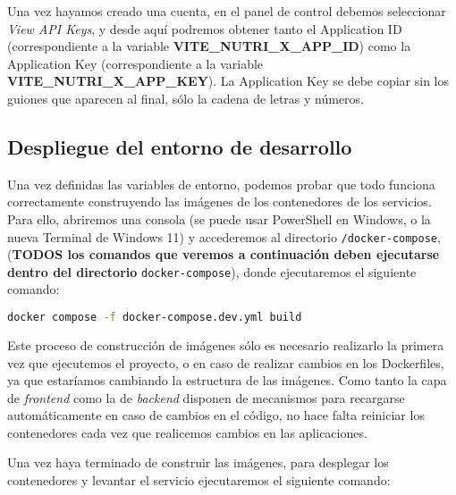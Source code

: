 
Una vez hayamos creado una cuenta, en el panel de control debemos seleccionar \textit{View API Keys}, y desde aquí podremos obtener tanto el Application ID (correspondiente a la variable \textbf{VITE\_NUTRI\_X\_APP\_ID}) como la Application Key (correspondiente a la variable \textbf{VITE\_NUTRI\_X\_APP\_KEY}). La Application Key se debe copiar sin los guiones que aparecen al final, sólo la cadena de letras y números.


\subsection{Despliegue del entorno de desarrollo}


Una vez definidas las variables de entorno, podemos probar que todo funciona correctamente construyendo las imágenes de los contenedores de los servicios. Para ello, abriremos una consola (se puede usar PowerShell en Windows, o la nueva Terminal de Windows 11) y accederemos al directorio \verb,/docker-compose,, (\textbf{TODOS los comandos que veremos a continuación deben ejecutarse dentro del directorio} \verb,docker-compose,), donde ejecutaremos el siguiente comando:

\begin{lstlisting}[language=Bash]
docker compose -f docker-compose.dev.yml build
\end{lstlisting}


Este proceso de construcción de imágenes sólo es necesario realizarlo la primera vez que ejecutemos el proyecto, o en caso de realizar cambios en los Dockerfiles, ya que estaríamos cambiando la estructura de las imágenes. Como tanto la capa de \textit{frontend} como la de \textit{backend} disponen de mecanismos para recargarse automáticamente en caso de cambios en el código, no hace falta reiniciar los contenedores cada vez que realicemos cambios en las aplicaciones.

Una vez haya terminado de construir las imágenes, para desplegar los contenedores y levantar el servicio ejecutaremos el siguiente comando:

